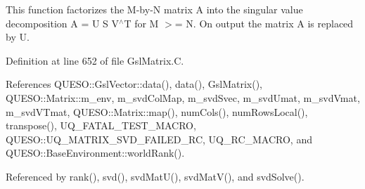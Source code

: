 This function factorizes the M-\/by-\/\-N matrix A into the singular value decomposition A = U S V$^\wedge$\-T for M $>$= N. On output the matrix A is replaced by U. 



Definition at line 652 of file Gsl\-Matrix.\-C.



References Q\-U\-E\-S\-O\-::\-Gsl\-Vector\-::data(), data(), Gsl\-Matrix(), Q\-U\-E\-S\-O\-::\-Matrix\-::m\-\_\-env, m\-\_\-svd\-Col\-Map, m\-\_\-svd\-Svec, m\-\_\-svd\-Umat, m\-\_\-svd\-Vmat, m\-\_\-svd\-V\-Tmat, Q\-U\-E\-S\-O\-::\-Matrix\-::map(), num\-Cols(), num\-Rows\-Local(), transpose(), U\-Q\-\_\-\-F\-A\-T\-A\-L\-\_\-\-T\-E\-S\-T\-\_\-\-M\-A\-C\-R\-O, Q\-U\-E\-S\-O\-::\-U\-Q\-\_\-\-M\-A\-T\-R\-I\-X\-\_\-\-S\-V\-D\-\_\-\-F\-A\-I\-L\-E\-D\-\_\-\-R\-C, U\-Q\-\_\-\-R\-C\-\_\-\-M\-A\-C\-R\-O, and Q\-U\-E\-S\-O\-::\-Base\-Environment\-::world\-Rank().



Referenced by rank(), svd(), svd\-Mat\-U(), svd\-Mat\-V(), and svd\-Solve().


